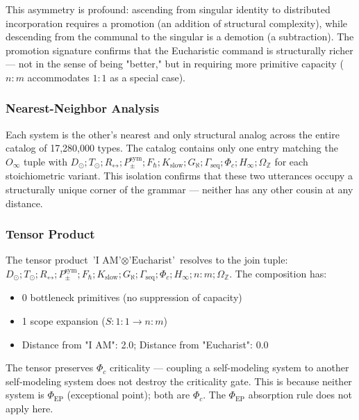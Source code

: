 \documentclass[12pt,a4paper]{article}
\begin{document}
This asymmetry is profound: ascending from singular identity to distributed incorporation requires a promotion (an addition of structural complexity), while descending from the communal to the singular is a demotion (a subtraction). The promotion signature confirms that the Eucharistic command is structurally richer --- not in the sense of being "better," but in requiring more primitive capacity ($n{:}m$ accommodates $1{:}1$ as a special case).

\subsubsection{Nearest-Neighbor Analysis}

Each system is the other's nearest and only structural analog across the entire catalog of 17,280,000 types. The catalog contains only one entry matching the $O_{\infty}$ tuple with $D_{\odot}; T_{\odot}; R_{\leftrightarrow}; P_{\pm}^{\text{sym}}; F_{\hbar}; K_{\text{slow}}; G_{\aleph}; \Gamma_{\text{seq}}; \Phi_c; H_{\infty}; \Omega_\mathbb{Z}$ for each stoichiometric variant. This isolation confirms that these two utterances occupy a structurally unique corner of the grammar --- neither has any other cousin at any distance.

\subsubsection{Tensor Product}

The tensor product $\text{'I AM'} \otimes \text{'Eucharist'}$ resolves to the join tuple: $D_{\odot}; T_{\odot}; R_{\leftrightarrow}; P_{\pm}^{\text{sym}}; F_{\hbar}; K_{\text{slow}}; G_{\aleph}; \Gamma_{\text{seq}}; \Phi_c; H_{\infty}; n{:}m; \Omega_\mathbb{Z}$. The composition has:

\begin{itemize}
    \item 0 bottleneck primitives (no suppression of capacity)
    \item 1 scope expansion ($S: 1{:}1 \to n{:}m$)
    \item Distance from "I AM": 2.0; Distance from "Eucharist": 0.0
\end{itemize}

The tensor preserves $\Phi_c$ criticality --- coupling a self-modeling system to another self-modeling system does not destroy the criticality gate. This is because neither system is $\Phi_{\text{EP}}$ (exceptional point); both are $\Phi_c$. The $\Phi_{\text{EP}}$ absorption rule does not apply here.
\end{document}

